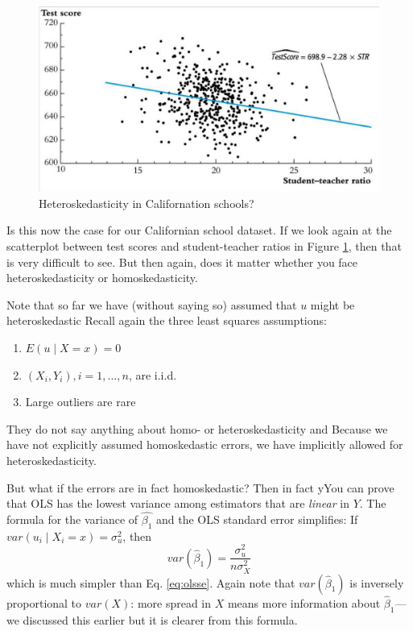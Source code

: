 \documentclass[
]{book}
\providecommand{\tightlist}{%
  \setlength{\itemsep}{0pt}\setlength{\parskip}{0pt}}
\begin{document}
\begin{figure}
\includegraphics[width=17.92in]{./figures/Sheet24} \caption{Heteroskedasticity in Californation schools?}\label{fig:heteroskedasticityca}
\end{figure}

Is this now the case for our Californian school dataset. If we look again at the scatterplot between test scores and student-teacher ratios in Figure \ref{fig:heteroskedasticityca}, then that is very difficult to see. But then again, does it matter whether you face heteroskedasticity or homoskedasticity.

Note that so far we have (without saying so) assumed that \(u\) might be heteroskedastic
Recall again the three least squares assumptions:

\begin{enumerate}
\def\labelenumi{\arabic{enumi}.}
\tightlist
\item
  \(E(u \mid X = x) = 0\)
\item
  \((X_i,Y_i), i =1,\ldots,n\), are i.i.d.
\item
  Large outliers are rare
\end{enumerate}

They do not say anything about homo- or heteroskedasticity and Because we have not explicitly assumed homoskedastic errors, we have implicitly allowed for heteroskedasticity.

But what if the errors are in fact homoskedastic? Then in fact yYou can prove that OLS has the lowest variance among estimators that are \emph{linear} in \(Y\). The formula for the variance of \(\hat{\beta_1}\) and the OLS standard error simplifies: If \(var(u_i \mid X_i=x) = \sigma_u^2\), then
\begin{equation}
    var(\hat{\beta}_1) = \frac{\sigma_u^2}{n\sigma_X^2}
    \label{eq:olssesimple}
\end{equation}
which is much simpler than Eq. \eqref{eq:olsse}. Again note that \(var(\hat{\beta}_1)\) is inversely proportional to \(var(X)\): more spread in \(X\) means more information about \(\hat{\beta}_1\)---we discussed this earlier but it is clearer from this formula.
\end{document}
